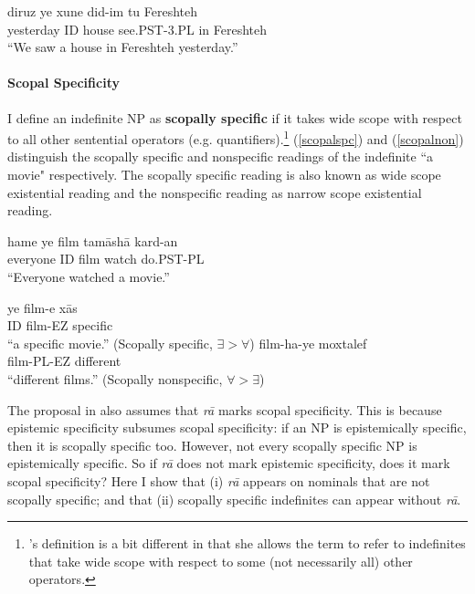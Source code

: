 \documentclass[12pt]{article}
\begin{document}
    	\begin {exe}
		\ex \label{zamin} \gll	diruz {\color {red}ye}	xune did-im tu Fereshteh\\
			yesterday	{\scriptsize ID}	house	see.{\scriptsize PST-3.PL} in Fereshteh\\
			``We saw a house in Fereshteh yesterday.''
    	\end {exe}

\paragraph{Scopal Specificity} I define an indefinite NP as \textbf{scopally specific} if it takes wide scope with respect to all other sentential operators (e.g. quantifiers).\footnote{\citet{farkas1994specificity}'s definition is a bit different in that she allows the term to refer to indefinites that take wide scope with respect to some (not necessarily all) other operators.} (\ref {scopalspc}) and (\ref {scopalnon}) distinguish the scopally specific and nonspecific readings of the indefinite ``a movie" respectively. The scopally specific reading is also known as wide scope existential reading and the nonspecific reading as narrow scope existential reading.

	\begin {exe}
		\ex	\label {scopal} \gll	hame	ye film	tam\={a}sh\={a} kard-an\\
    			everyone {\scriptsize ID}	film watch	do{\scriptsize .PST-PL}\\
    		\glt 	``Everyone watched a movie.'' \begin {xlist}
			\ex \label {scopalspc} \gll	ye film-e x\={a}s\\
    			{\scriptsize ID}	film-{\scriptsize EZ}	specific\\
    		\glt 	``a specific movie.'' (Scopally specific, $\exists > \forall$)
			\ex \label {scopalnon} \gll	film-ha-ye	moxtalef\\
    			film-{\scriptsize PL-EZ}	different\\
    		\glt 	``different films.'' (Scopally nonspecific, $\forall > \exists$)		\end {xlist}
	\end {exe}


The proposal in \cite{karimi1990obliqueness} also assumes that \emph{r\={a}} marks scopal specificity. This is because epistemic specificity subsumes scopal specificity: if an NP is epistemically specific, then it is scopally specific too. However, not every scopally specific NP is epistemically specific. So if \emph{r\={a}} does not mark epistemic specificity, does it mark scopal specificity? Here I show that (i) \emph{r\={a}} appears on nominals that are not scopally specific; and that (ii) scopally specific indefinites can appear without \emph{r\={a}}. 
\end{document}
